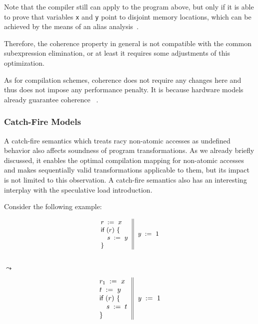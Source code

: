 Note that the compiler still can apply \CSE to the program above, 
but only if it is able to prove that variables \texttt{x} and \texttt{y} 
point to disjoint memory locations, which can be achieved 
by the means of an alias analysis~\cite{Diwan-al:PLDI1998}.  

Therefore, the coherence property in general is not compatible 
with the common subexpression elimination, or at least 
it requires some adjustments of this optimization.

As for compilation schemes, coherence does not require 
any changes here and thus does not impose any performance penalty.
It is because hardware models already guarantee coherence%
~\cite{Alglave-al:TOPLAS14, Sarkar-al:PLDI11, Sewell-al:CACM10, Lahav-al:PLDI17}. 

\subsubsection{Catch-Fire Models}
\label{sec:analysis:ub}

A catch-fire semantics which treats racy non-atomic 
accesses as undefined behavior also affects  
soundness of program transformations. 
As we already briefly discussed, it enables 
the optimal compilation mapping for non-atomic accesses and 
makes sequentially valid transformations applicable 
to them, but its impact is not limited to this observation. 
A catch-fire semantics also has an interesting interplay
with the speculative load introduction.

Consider the following example:

\begin{minipage}{0.43\linewidth}
\begin{equation*}
\small
\inarrII{
  \readInst{}{r}{x}      \\
  \kw{if} {(r)} ~\{      \\
  \quad\readInst{}{s}{y} \\
  \}

}{
  \writeInst{}{y}{1}       \\
}
\label{ex:sliA}
\end{equation*}
\end{minipage}\hfill%
\begin{minipage}{0.09\linewidth}
\Large~\\ $\leadsto$
\end{minipage}\hfill%
\begin{minipage}{0.43\linewidth}
\begin{equation*}
\inarrII{
  \readInst{}{r_1}{x}      \\
  \readInst{}{t}{y}        \\
  \kw{if} {(r)} ~\{        \\
  \quad\assignInst{s}{t}   \\
  \}

}{
  \writeInst{}{y}{1}       \\
}
\label{ex:sliB}
\end{equation*}
\end{minipage}
 
